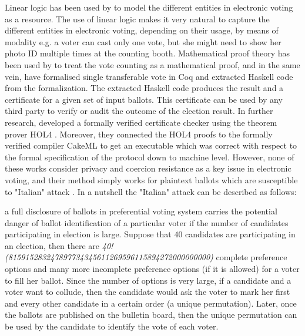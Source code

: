  \noindent
 Linear logic \citep{GIRARD19871} has been used by \citep{DeYoung:2012:LLV} to model the different entities in electronic voting as a resource. 
 The use of linear logic makes it very natural to capture the different entities in electronic voting,  
 depending on their usage, by means of modality e.g. a voter can cast only one vote, but she might 
 need to show her photo ID multiple times at the counting booth. Mathematical proof theory has 
 been used by \citep{Pattinson:2015:VCM}  to treat the vote counting as a mathematical 
 proof, and in the same vein, 
 \citep{Ghale:2017:FVS} have formalised single transferable vote in Coq and 
 extracted Haskell code from the formalization. The extracted Haskell code produces the result 
 and a certificate for a given set of input ballots. This certificate can be used by any third party to verify 
 or audit the outcome of the election result.  In further research, \citep{10.1007/978-3-030-03592-1_5} 
 developed a formally verified certificate checker using the theorem prover HOL4 \citep{Slind:2008:BOH:1459784.1459792}. 
 Moreover, they connected the HOL4 proofs to the formally verified compiler CakeML \citep{Kumar:2014:CVI} 
 to get an executable which was correct with respect to the formal specification of the protocol
 down to machine level. 
 However, none of these works consider privacy and coercion resistance as a key 
 issue in electronic voting, and their method simply works for plaintext ballots which are  susceptible to 
 "Italian" attack  \citep{Otten}   \citep{Benaloh:2009:SSC}.  In a nutshell the "Italian" attack can be described 
 as follows: 
 \begin{displayquote}
 a full disclosure of 
 ballots in preferential voting system carries the potential danger of  ballot identification of 
 a particular voter if the number of candidates participating in election is large. Suppose
 that 40 candidates are participating in an election, then there are \textit{40!
 (815915283247897734345611269596115894272000000000)} complete 
 preference options and many more incomplete  preference options  (if it is allowed) for a voter to 
 fill her ballot. Since the number of options is very large, if a candidate and a voter want 
 to collude, then the candidate would ask the voter to mark her first and every other candidate 
 in a certain order (a unique permutation). Later, once the ballots are published 
 on the bulletin board, then the unique permutation can be used by the candidate to 
 identify the vote of each voter.  
 \end{displayquote}
 

